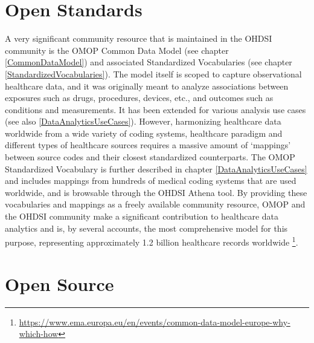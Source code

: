 \documentclass[11pt]{book}
\let\rmarkdownfootnote\footnote%
\def\footnote{\protect\rmarkdownfootnote}
\theoremstyle{definition}
\theoremstyle{definition}
\theoremstyle{definition}
\theoremstyle{remark}
\begin{document}
\hypertarget{open-standards}{%
\section{Open Standards}\label{open-standards}}


A very significant community resource that is maintained in the OHDSI community is the OMOP Common Data Model (see chapter \ref{CommonDataModel}) and associated Standardized Vocabularies (see chapter \ref{StandardizedVocabularies}). The model itself is scoped to capture observational healthcare data, and it was originally meant to analyze associations between exposures such as drugs, procedures, devices, etc., and outcomes such as conditions and measurements. It has been extended for various analysis use cases (see also \ref{DataAnalyticsUseCases}). However, harmonizing healthcare data worldwide from a wide variety of coding systems, healthcare paradigm and different types of healthcare sources requires a massive amount of `mappings' between source codes and their closest standardized counterparts. The OMOP Standardized Vocabulary is further described in chapter \ref{DataAnalyticsUseCases} and includes mappings from hundreds of medical coding systems that are used worldwide, and is browsable through the OHDSI Athena tool. By providing these vocabularies and mappings as a freely available community resource, OMOP and the OHDSI community make a significant contribution to healthcare data analytics and is, by several accounts, the most comprehensive model for this purpose, representing approximately 1.2 billion healthcare records worldwide \citep{garza_2016} \footnote{\url{https://www.ema.europa.eu/en/events/common-data-model-europe-why-which-how}}.

\hypertarget{open-source}{%
\section{Open Source}\label{open-source}}

\end{document}
